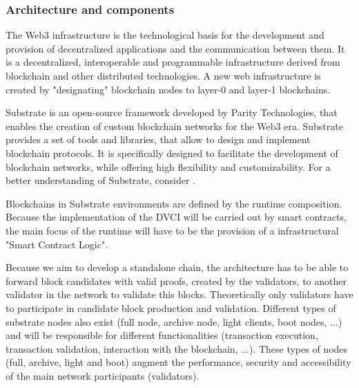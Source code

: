 \documentclass[]{article}
\begin{document}
\subsubsection{Architecture and components}
The Web3 infrastructure is the technological basis for the development and provision of decentralized applications and the communication between them. 
It is a decentralized, interoperable and programmable infrastructure derived from blockchain and other distributed technologies.
A new web infrastructure is created by "designating" blockchain nodes to layer-0 and layer-1 blockchains.

Substrate is an open-source framework developed by Parity Technologies, that enables the creation of custom blockchain networks for the Web3 era.
Substrate provides a set of tools and libraries, that allow to design and implement blockchain protocols.
It is specifically designed to facilitate the development of blockchain networks, while offering high flexibility and customizability. 
For a better understanding of Substrate, consider \cite{SubstrateDoc}.

Blockchains in Substrate environments are defined by the runtime composition. 
Because the implementation of the DVCI will be carried out by smart contracts, the main focus of the runtime will have to be the provision of a infrastructural "Smart Contract Logic".

Because we aim to develop a standalone chain, the architecture has to be able to forward block candidates with valid proofs, created by the validators, to another validator in the network to validate this blocks. 
Theoretically only validators have to participate in candidate block production and validation. 
Different types of substrate nodes also exist (full node, archive node, light clients, boot nodes, ...) and will be responsible for different functionalities (transaction execution, transaction validation, interaction with the blockchain, ...).
These types of nodes (full, archive, light and boot) augment the performance, security and accessibility of the main network participants (validators).
\end{document}
